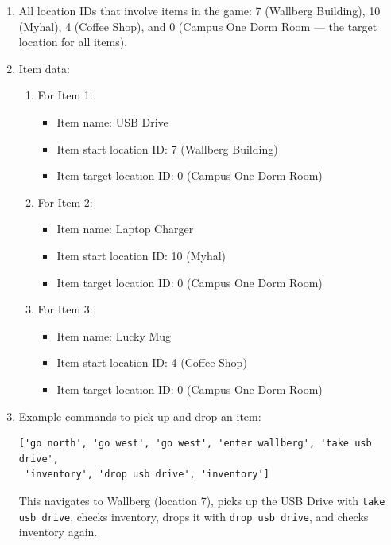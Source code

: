 \documentclass[11pt]{article}
\begin{document}
\begin{enumerate}
\item All location IDs that involve items in the game: 7 (Wallberg Building), 10 (Myhal), 4 (Coffee Shop), and 0 (Campus One Dorm Room --- the target location for all items).

\item Item data:
\begin{enumerate}
    \item For Item 1:
    \begin{itemize}
    \item Item name: USB Drive
    \item Item start location ID: 7 (Wallberg Building)
    \item Item target location ID: 0 (Campus One Dorm Room)
    \end{itemize}
    \item For Item 2:
    \begin{itemize}
    \item Item name: Laptop Charger
    \item Item start location ID: 10 (Myhal)
    \item Item target location ID: 0 (Campus One Dorm Room)
    \end{itemize}
    \item For Item 3:
    \begin{itemize}
    \item Item name: Lucky Mug
    \item Item start location ID: 4 (Coffee Shop)
    \item Item target location ID: 0 (Campus One Dorm Room)
    \end{itemize}
\end{enumerate}

    \item Example commands to pick up and drop an item:
\begin{verbatim}
['go north', 'go west', 'go west', 'enter wallberg', 'take usb drive',
 'inventory', 'drop usb drive', 'inventory']
\end{verbatim}
    This navigates to Wallberg (location 7), picks up the USB Drive with \verb|take usb drive|, checks inventory, drops it with \verb|drop usb drive|, and checks inventory again.


\end{enumerate}
\end{document}
